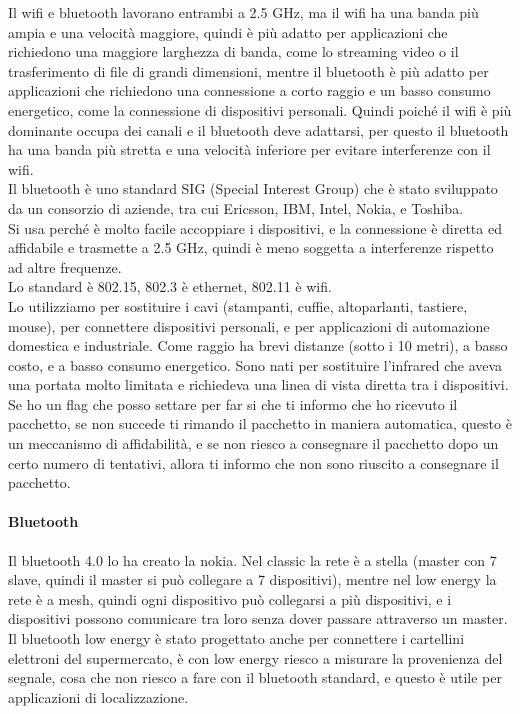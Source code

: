 Il wifi e bluetooth lavorano entrambi a 2.5 GHz, ma il wifi ha una banda più ampia e una velocità maggiore, quindi è più adatto per applicazioni che richiedono una maggiore larghezza di banda, come lo streaming video o il trasferimento di file di grandi dimensioni, mentre il bluetooth è più adatto per applicazioni che richiedono una connessione a corto raggio e un basso consumo energetico, come la connessione di dispositivi personali. Quindi poiché il wifi è più dominante occupa dei canali e il bluetooth deve adattarsi, per questo il bluetooth ha una banda più stretta e una velocità inferiore per evitare interferenze con il wifi.\\

Il bluetooth è uno standard SIG (Special Interest Group) che è stato sviluppato da un consorzio di aziende, tra cui Ericsson, IBM, Intel, Nokia, e Toshiba.\\

Si usa perché è molto facile accoppiare i dispositivi, e la connessione è diretta ed affidabile e trasmette a 2.5 GHz, quindi è meno soggetta a interferenze rispetto ad altre frequenze.\\

Lo standard è 802.15, 802.3 è ethernet, 802.11 è wifi.\\

Lo utilizziamo per sostituire i cavi (stampanti, cuffie, altoparlanti, tastiere, mouse), per connettere dispositivi personali, e per applicazioni di automazione domestica e industriale. Come raggio ha brevi distanze (sotto i 10 metri), a basso costo, e a basso consumo energetico. Sono nati per sostituire l'infrared che aveva una portata molto limitata e richiedeva una linea di vista diretta tra i dispositivi.\\
Se ho un flag che posso settare per far si che ti informo che ho ricevuto il pacchetto, se non succede ti rimando il pacchetto in maniera automatica, questo è un meccanismo di affidabilità, e se non riesco a consegnare il pacchetto dopo un certo numero di tentativi, allora ti informo che non sono riuscito a consegnare il pacchetto.\\

\paragraph{Bluetooth}
Il bluetooth 4.0 lo ha creato la nokia. Nel classic la rete è a stella (master con 7 slave, quindi il master si può collegare a 7 dispositivi), mentre nel low energy la rete è a mesh, quindi ogni dispositivo può collegarsi a più dispositivi, e i dispositivi possono comunicare tra loro senza dover passare attraverso un master.\\
Il bluetooth low energy è stato progettato anche per connettere i cartellini elettroni del supermercato, è con low energy riesco a misurare la provenienza del segnale, cosa che non riesco a fare con il bluetooth standard, e questo è utile per applicazioni di localizzazione.\\

